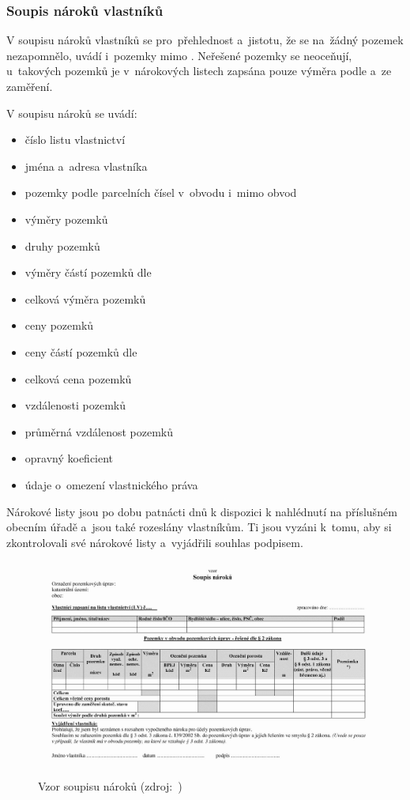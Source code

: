 \subsubsection{Soupis nároků vlastníků}
\label{soupis_naroku_vlastniku}

V soupisu nároků vlastníků se pro~přehlednost a~jistotu, že se na~žádný pozemek nezapomnělo, uvádí i~pozemky mimo . Neřešené pozemky se neoceňují, u~takových pozemků je v~nárokových listech zapsána pouze výměra podle  a~ze zaměření.

V soupisu nároků se uvádí:
	\begin{itemize}[leftmargin=1.5cm, noitemsep]
		\item číslo listu vlastnictví
		\item jména a~adresa vlastníka
		\item pozemky podle parcelních čísel v~obvodu i~mimo obvod 
		\item výměry pozemků
		\item druhy pozemků
		\item výměry částí pozemků dle 
		\item celková výměra pozemků
		\item ceny pozemků
		\item ceny částí pozemků dle 
		\item celková cena pozemků
		\item vzdálenosti pozemků
		\item průměrná vzdálenost pozemků
		\item opravný koeficient
		\item údaje o~omezení vlastnického práva
	\end{itemize}

Nárokové listy jsou po dobu patnácti dnů k dispozici k nahlédnutí na příslušném obecním úřadě a~jsou také rozeslány vlastníkům. Ti jsou vyzáni k~tomu, aby si zkontrolovali své nárokové listy a~vyjádřili souhlas podpisem.
 	
	\begin{figure}[H]
		\centering
		\includegraphics[width=.9\textwidth]{./pictures/soupis_naroku.png}
		\caption[Vzor soupisu nároků]{Vzor soupisu nároků (zdroj:~\citep{vyhlaska_13})}
		\label{fig:soupis_naroku}
 	\end{figure}


